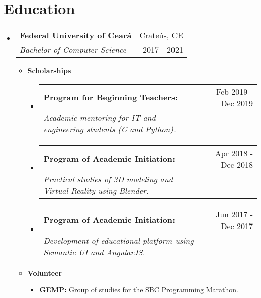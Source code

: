 \documentclass[letterpaper,11pt]{article}
\makeatletter
\newcommand{\resumeSubheading}[4]{
    \vspace{-1pt}\item
        \begin{tabular*}{0.97\textwidth}{l@{\extracolsep{\fill}}r}
            \textbf{#1} & #2 \\
            \textit{\small#3} & \small #4 \\
        \end{tabular*}
    \vspace{-5pt}
}
\newcommand{\resumeScholarship}[4]{
    \vspace{-1pt}\item
        \begin{tabular*}{0.89\textwidth}{l@{\extracolsep{\fill}}r}
            \textbf{\small#1} & #2 \\
            \textit{\small#3} & \small #4 \\
        \end{tabular*}\vspace{-5pt}
    \vspace{0.3cm}
}
\newcommand{\resumeSubHeadingListStart}{\begin{itemize}[leftmargin=*]}
\newcommand{\resumeSubHeadingListEnd}{\end{itemize}}
\makeatother
\begin{document}
\section{\faGraduationCap \hspace{0.2cm} \Large Education}
    \resumeSubHeadingListStart
        \resumeSubheading
        {Federal University of Ceará}{\faMapMarker \hspace{0.1cm} Crateús, CE}
        {Bachelor of Computer Science}{\faCalendar \hspace{0.1cm} 2017 - 2021}
        \begin{itemize}
            \item \textbf{Scholarships}
                \begin{itemize}
                    \resumeScholarship
                    {Program for Beginning Teachers:}{\faCalendar \hspace{0.1cm} \small Feb 2019 - Dec 2019}
                    {Academic mentoring for IT and engineering students (C and Python).}{}
            
                    \resumeScholarship
                    {Program of Academic Initiation:}{\faCalendar \hspace{0.1cm} \small Apr 2018 - Dec 2018}
                    {Practical studies of 3D modeling and Virtual Reality using Blender.}{}
        
                    \resumeScholarship
                    {Program of Academic Initiation:}{\faCalendar \hspace{0.1cm} \small Jun 2017 - Dec 2017}
                    {Development of educational platform using Semantic UI and AngularJS.}{}
                \end{itemize}
        \end{itemize}
      
        \begin{itemize}
            \item \textbf{Volunteer}
                \begin{itemize}
                    \item \textbf{GEMP:} Group of studies for the SBC Programming Marathon. \href{https://github.com/GEMP-UFC-Crateus}{\scriptsize \faExternalLink}
                \end{itemize}
        \end{itemize}
        
        \vspace{0.1cm}
    \resumeSubHeadingListEnd
  
\end{document}
